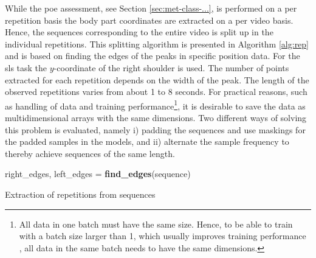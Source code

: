 While the \gls{poe} assessment, see Section \ref{sec:met-class-...}, is performed on a per repetition basis the body part coordinates are extracted on a per video basis. Hence, the sequences corresponding to the entire video is split up in the individual repetitions. This splitting algorithm is presented in Algorithm \ref{alg:rep} and is based on finding the edges of the peaks in specific position data. For the \gls{sls} task the $y$-coordinate of the right shoulder is used. The number of points extracted for each repetition depends on the width of the peak. The length of the observed repetitions varies from about 1 to 8 seconds. For practical reasons, such as handling of data and training performance\footnote{All data in one batch must have the same size. Hence, to be able to train with a batch size larger than 1, which usually improves training performance \cite{Goodfellow2016}, all data in the same batch needs to have the same dimensions.}, it is desirable to save the data as multidimensional arrays with the same dimensions. Two different ways of solving this problem is evaluated, namely i) padding the sequences and use maskings for the padded samples in the models, and ii) alternate the sample frequency to thereby achieve sequences of the same length.

\begin{algorithm}
\SetAlgoLined
right\_edges, left\_edges = \textbf{find\_edges}(sequence)\;
 \For{\textup{peak, right, current\_left, next\_left} in \textup{peaks, right\_edges, left\_edges}}{
  split\_index = \textbf{mean}(right, next\_left)\;
  start = \textbf{max}(current\_left - extra\_points, 0)\;
  end = \textbf{min}(right + extra\_points, split\_index)\;
  \textit{repetition} = \textbf{normalize\_length}(sequence[start:end])\;
  sequence = sequence[end:]\;
 }
 \caption{Extraction of repetitions from sequences}
 \label{alg:rep}
\end{algorithm}

